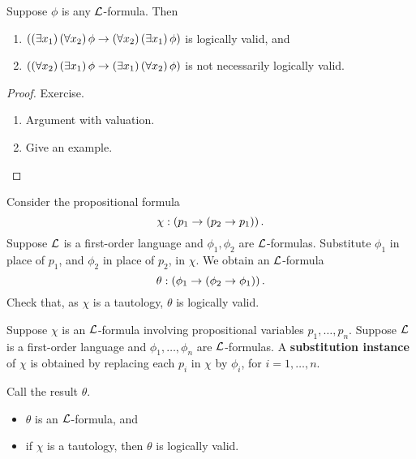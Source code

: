 \pagebreak

\begin{example1}
Suppose $ \phi $ is any $ \mathcal{L} $-formula. Then
\begin{enumerate}
\item $ \left( \left( \exists x_1 \right)\left( \forall x_2 \right)\phi \rightarrow \left( \forall x_2 \right)\left( \exists x_1 \right)\phi \right) $ is logically valid, and
\item $ \left( \left( \forall x_2 \right)\left( \exists x_1 \right)\phi \rightarrow \left( \exists x_1 \right)\left( \forall x_2 \right)\phi \right) $ is not necessarily logically valid.
\end{enumerate}
\end{example1}

\begin{proof}
Exercise.
\begin{enumerate}
\item Argument with valuation.
\item Give an example.
\end{enumerate}
\end{proof}

\begin{example2}
Consider the propositional formula
$$ \chi : \left( p_1 \rightarrow \left( p_2 \rightarrow p_1 \right) \right). $$
Suppose $ \mathcal{L} $ is a first-order language and $ \phi_1, \phi_2 $ are $ \mathcal{L} $-formulas. Substitute $ \phi_1 $ in place of $ p_1 $, and $ \phi_2 $ in place of $ p_2 $, in $ \chi $. We obtain an $ \mathcal{L} $-formula
$$ \theta : \left( \phi_1 \rightarrow \left( \phi_2 \rightarrow \phi_1 \right) \right). $$
Check that, as $ \chi $ is a tautology, $ \theta $ is logically valid.
\end{example2}

\begin{definition}
Suppose $ \chi $ is an $ \mathcal{L} $-formula involving propositional variables $ p_1, \dots, p_n $. Suppose $ \mathcal{L} $ is a first-order language and $ \phi_1, \dots, \phi_n $ are $ \mathcal{L} $-formulas. A \textbf{substitution instance} of $ \chi $ is obtained by replacing each $ p_i $ in $ \chi $ by $ \phi_i $, for $ i = 1, \dots, n $.
\end{definition}

Call the result $ \theta $.

\begin{theorem}
\hfill
\begin{itemize}
\item $ \theta $ is an $ \mathcal{L} $-formula, and
\item if $ \chi $ is a tautology, then $ \theta $ is logically valid.
\end{itemize}
\end{theorem}

